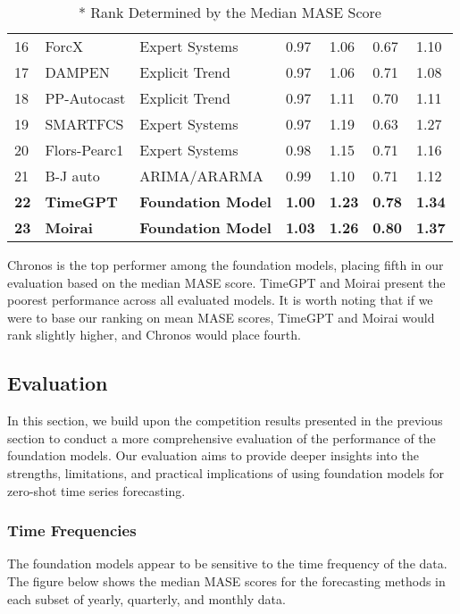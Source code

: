 \documentclass[12pt,a4paper]{article}
\begin{document}
\begin{table}[htbp]
{\begin{tabular}{lllllll}
  16 & ForcX & Expert Systems & 0.97 & 1.06 & 0.67 & 1.10 \\
  17 & DAMPEN & Explicit Trend & 0.97 & 1.06 & 0.71 & 1.08 \\
  18 & PP-Autocast & Explicit Trend & 0.97 & 1.11 & 0.70 & 1.11 \\
  19 & SMARTFCS & Expert Systems & 0.97 & 1.19 & 0.63 & 1.27 \\
  20 & Flors-Pearc1 & Expert Systems & 0.98 & 1.15 & 0.71 & 1.16 \\
  21 & B-J auto & ARIMA/ARARMA & 0.99 & 1.10 & 0.71 & 1.12 \\
  \textbf{22} & \textbf{TimeGPT} & \textbf{Foundation Model} & \textbf{1.00} & \textbf{1.23} & \textbf{0.78} & \textbf{1.34} \\
  \textbf{23} & \textbf{Moirai} & \textbf{Foundation Model} & \textbf{1.03} & \textbf{1.26} & \textbf{0.80} & \textbf{1.37} \\ \hline
  \end{tabular}%
  }
  \caption*{* Rank Determined by the Median MASE Score}
\end{table}

Chronos is the top performer among the foundation models, placing fifth in our evaluation based on the median MASE score. TimeGPT and Moirai present the poorest performance across all evaluated models. It is worth noting that if we were to base our ranking on mean MASE scores, TimeGPT and Moirai would rank slightly higher, and Chronos would place fourth.

\subsection{Evaluation}

In this section, we build upon the competition results presented in the previous section to conduct a more comprehensive evaluation of the performance of the foundation models. Our evaluation aims to provide deeper insights into the strengths, limitations, and practical implications of using foundation models for zero-shot time series forecasting. 

\subsubsection{Time Frequencies}


The foundation models appear to be sensitive to the time frequency of the data. The figure below shows the median MASE scores for the forecasting methods in each subset of yearly, quarterly, and monthly data. 
\end{document}
